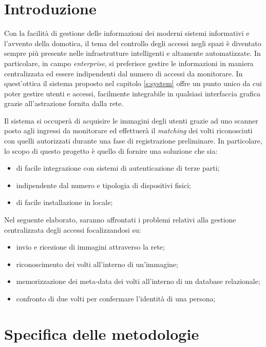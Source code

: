 \section{Introduzione}

Con la facilità di gestione delle informazioni dei moderni sistemi informativi e l'avvento della domotica, il tema del controllo degli accessi negli spazi è diventato sempre più presente nelle infrastrutture intelligenti e altamente automatizzate. In particolare, in campo \textit{enterprise}, si preferisce gestire le informazioni in maniera centralizzata ed essere indipendenti dal numero di accessi da monitorare. In quest'ottica il sistema proposto nel capitolo \ref{s:system} offre un punto unico da cui poter gestire utenti e accessi, facilmente integrabile in qualsiasi interfaccia grafica grazie all'astrazione fornita dalla rete.

Il sistema si occuperà di acquisire le immagini degli utenti grazie ad uno scanner posto agli ingressi da monitorare ed effettuerà il \textit{matching} dei volti riconosciuti con quelli autorizzati durante una fase di registrazione preliminare.
In particolare, lo scopo di questo progetto è quello di fornire una soluzione che sia:
\begin{itemize}
    \item di facile integrazione con sistemi di autenticazione di terze parti;
    \item indipendente dal numero e tipologia di dispositivi fisici;
    \item di facile installazione in locale;
\end{itemize}

Nel seguente elaborato, saranno affrontati i problemi relativi alla gestione centralizzata degli accessi focalizzandosi su:
\begin{itemize}
    \item invio e ricezione di immagini attraverso la rete;
    \item riconoscimento dei volti all'interno di un'immagine;
    \item memorizzazione dei meta-data dei volti all'interno di un database relazionale;
    \item confronto di due volti per confermare l'identità di una persona;
\end{itemize}

\section{Specifica delle metodologie}

